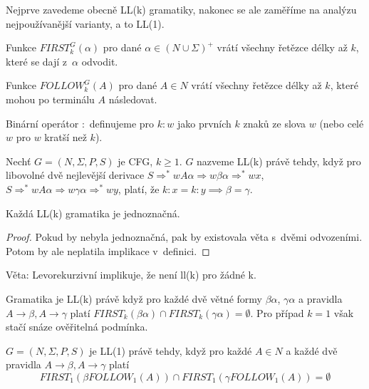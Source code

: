 
Nejprve zavedeme obecně LL(k) gramatiky, nakonec se ale zaměříme na
analýzu nejpoužívanější varianty, a to LL(1).

\begin{definition}
    Funkce $FIRST^G_k(\alpha)$ pro dané $\alpha \in (N \cup \Sigma)^+$
    vrátí všechny řetězce délky až $k$, které se dají z~$\alpha$
    odvodit.

    Funkce $FOLLOW^G_k(A)$ pro dané $A \in N$
    vrátí všechny řetězce délky až $k$, které mohou po terminálu $A$
    následovat.

    Binární operátor ${:}$ definujeme pro $k : w$ jako prvních $k$ znaků
    ze slova $w$ (nebo celé $w$ pro $w$ kratší než $k$).
\end{definition}

\begin{definition}
    Nechť $G = (N, \Sigma, P, S)$ je CFG, $k \geq 1$. $G$ nazveme LL(k)
    právě tehdy, když pro libovolné dvě nejlevější derivace
    $S \Rightarrow^* wA\alpha \Rightarrow w\beta\alpha \Rightarrow^* wx$,
    $S \Rightarrow^* wA\alpha \Rightarrow w\gamma\alpha \Rightarrow^* wy$,
    platí, že $k : x = k : y \implies \beta = \gamma$.
\end{definition}

\begin{theorem}
    Každá LL(k) gramatika je jednoznačná.
\end{theorem}

\begin{proof}
Pokud by nebyla jednoznačná, pak by existovala věta s~dvěmi odvozeními.
Potom by ale neplatila implikace v~definici.
\end{proof}

Věta: Levorekurzivní implikuje, že není ll(k) pro žádné k.

Gramatika je LL(k) právě když pro každé dvě větné formy $\beta \alpha$,
$\gamma \alpha$ a pravidla $A \to \beta, A \to \gamma$
platí $FIRST_k(\beta \alpha) \cap FIRST_k(\gamma \alpha) = \emptyset$.
Pro případ $k = 1$ však stačí snáze ověřitelná podmínka.

\begin{theorem}
    $G = (N, \Sigma, P, S)$ je LL(1) právě tehdy, když
    pro každé $A \in N$
    a každé dvě pravidla $A \to \beta, A \to \gamma$
    platí
    \[
        FIRST_1(\beta FOLLOW_1(A)) \cap FIRST_1(\gamma FOLLOW_1(A)) = \emptyset
    \]
\end{theorem}


